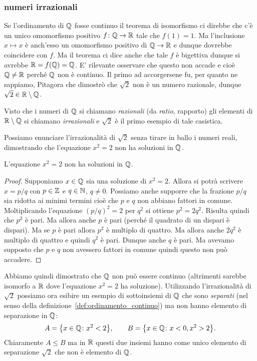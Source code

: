 \subsubsection{numeri irrazionali}

Se l'ordinamento di ${\mathbb Q}$ fosse continuo il teorema 
di isomorfismo ci direbbe 
che c'è un unico omomorfismo positivo $f\colon {\mathbb Q} \to {\mathbb R}$ 
tale che $f(1)=1$. 
Ma l'inclusione $x\mapsto x$ è anch'esso un omomorfismo positivo 
di ${\mathbb Q} \to {\mathbb R}$ e dunque dovrebbe coincidere con $f$.
Ma il teorema ci dice anche che tale $f$ è bigettiva dunque 
si avrebbe ${\mathbb R} = f({\mathbb Q}) = {\mathbb Q}$.
E' rilevante osservare che questo non accade e cioè 
${\mathbb Q}\neq {\mathbb R}$ perché ${\mathbb Q}$ non è continuo. 
Il primo ad accorgersene fu, per quanto ne sappiamo,
Pitagora che dimostrò che $\sqrt 2$
non è un numero razionale, dunque $\sqrt 2 \in {\mathbb R} \setminus {\mathbb Q}$.

Visto che i numeri di ${\mathbb Q}$ si chiamano \emph{razionali} (da \emph{ratio}, rapporto)
gli elementi di ${\mathbb R}\setminus {\mathbb Q}$ si chiamano \emph{irrazionali} e $\sqrt 2$ 
è il primo esempio di tale casistica.

Possiamo enunciare l'irrazionalità di $\sqrt 2$ 
senza tirare in ballo i numeri reali, 
dimostrando che l'equazione $x^2=2$ non ha soluzioni in ${\mathbb Q}$.

\begin{theorem}
  \mymark{**}%
  \label{th:pitagora}%
  L'equazione $x^2=2$ non ha soluzioni in ${\mathbb Q}$.
  \end{theorem}
  \begin{proof}
  \mymark{*}%
  Supponiamo $x\in {\mathbb Q}$ sia una soluzione di $x^2=2$.
  Allora si potrà scrivere $x=p/q$ con $p\in {\mathbb Z}$ e $q\in {\mathbb N}$, $q\neq 0$.
  Possiamo anche supporre che la frazione $p/q$ sia ridotta ai minimi
  termini cioè che $p$ e $q$ non abbiano fattori in comune.
  Moltiplicando l'equazione
  $(p/q)^2=2$ per $q^2$ si ottiene $p^2 = 2 q^2$.
  Risulta quindi che $p^2$ è pari.
  Ma allora anche $p$ è pari (perché il quadrato di un dispari è dispari).
  Ma se $p$ è pari allora $p^2$ è multiplo di quattro.
  Ma allora anche $2q^2$ è multiplo di quattro e quindi $q^2$ è pari.
  Dunque anche $q$ è pari. Ma avevamo supposto che $p$ e $q$ non avessero
  fattori in comune quindi questo non può accadere.
\end{proof}

Abbiamo quindi dimostrato che ${\mathbb Q}$ non può essere continuo (altrimenti 
sarebbe isomorfo a ${\mathbb R}$ dove l'equazione $x^2=2$ ha soluzione). 
Utilizzando l'irrazionalità di $\sqrt 2$ 
possiamo ora esibire un esempio di sottoinsiemi di ${\mathbb Q}$ che sono 
\emph{separati} (nel senso della definizione~\ref{def:ordinamento_continuo})
ma non hanno elemento di separazione in ${\mathbb Q}$:
\[
A= {\left\{ x\in{\mathbb Q}\colon x^2< 2 \right\}},
\qquad
B = {\left\{ x\in {\mathbb Q}\colon x<0, x^2>2 \right\}}.  
\]
Chiaramente $A\le B$ ma in ${\mathbb R}$ questi due insiemi 
hanno come unico elemento di separazione $\sqrt 2$ che non è elemento di
${\mathbb Q}$.

